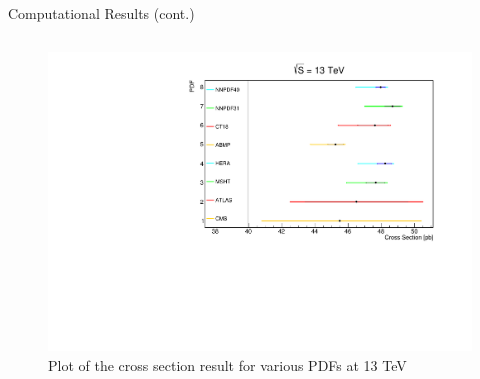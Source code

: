 \documentclass[10pt,t]{beamer}
\begin{document}
\begin{frame}{Computational Results (cont.)}
\begin{columns}
\begin{column}{0.5\textwidth}
            \begin{figure}
                 \centering
                 \includegraphics[scale=0.3]{Images/Graph3.pdf}
                 \caption{Plot of the cross section result for various PDFs at 13 TeV}
            \end{figure}
            
        \end{column}
        
    \end{columns}
\end{frame}
\end{document}

